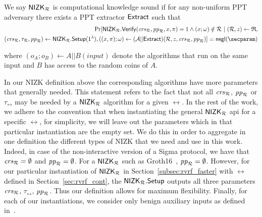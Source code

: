 \begin{definition}\label{def:nizk_knowledge_sound}
	We say ${\mathsf{NIZK}}_{\mathcal{R}}$ is {computational knowledge sound}  if %
	for any non-uniform PPT adversary \adv there exists a PPT extractor $ {\mathsf{Extract}} $
	such that
	\begin{align}
		\Pr[\NIZK_\rel.\Verify(\crs_\rel, \pp_\rel, x,\pi) = 1 \wedge  (x;\omega) \notin \rel \ | \ (\rel,z) \leftarrow \mathfrak{R}, \\  
		(\crs_\rel,\tau_\rel,  \pp_\rel) \leftarrow \NIZK_\rel.\Setup(1^{\lambda}),\nonumber ((x,\pi);\omega)\leftarrow (\adv||\Extract)(\rel, z, \crs_\rel,  \pp_\rel)] =  \negl(\secparam) \nonumber
	\end{align}
	
	\noindent where $ (o_A;o_B)\leftarrow A||B(input) $ denote the algorithms that run on the same input and $ B $ has access to the random coins of $ A $.
\end{definition}

\noindent In our NIZK definition above the corresponding algorithms have more parameters that generally needed. 
This statement refers to the fact that not all $\mathit{crs}_{\mathcal{R}}$, $\mathit{pp}_{\mathcal{R}}$ or $\tau_\rel$ may be needed by a ${\mathsf{NIZK}}_{\mathcal{R}}$ algorithm for a given $\rel$. 
In the rest of the work, we adhere to the convention that when instantiating the general ${\mathsf{NIZK}}_{\mathcal{R}}$ api for a specific $\rel$, for simplicity, 
we will leave out the parameters which in that particular instantiation are the empty set. We do this in order to aggregate in one definition 
the different types of NIZK that we need and use in this work. Indeed, in case of the non-interactive version of a Sigma protocol, we have 
that $\mathit{crs}_{\mathcal{R}} = \emptyset$ and $\mathit{pp}_{\mathcal{R}} = \emptyset$. For a ${\mathsf{NIZK}}_{\mathcal{R}}$ such as Groth16~\cite{Groth16}, $\mathit{pp}_{\mathcal{R}}  = \emptyset$. 
However, for our particular instantiation of ${\mathsf{NIZK}}_{\mathcal{R}}$ in Section~\ref{subsec:rvrf_faster} with $\rel$ defined in Section~\ref{sec:rvrf_cont}, the ${\mathsf{NIZK}}_{\mathcal{R}}.{\mathsf{Setup}}$ outputs 
all three parameters $\mathit{crs}_{\mathcal{R}}$, $\tau_\rel$, $\mathit{pp}_{\mathcal{R}}$. Thus our definition allows for maximum flexibility. Finally, for each of our instantiations, we consider only benign 
auxiliary inputs as defined in~\cite{bening_auxiliary}. 



